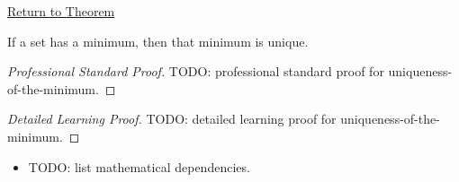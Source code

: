 \newpage
{}
\label{prf:uniqueness-of-the-minimum}

\begin{remark*}[Return]
\hyperref[prop:uniqueness-of-the-minimum]{Return to Theorem}
\end{remark*}

\begin{proposition*}
If a set has a minimum, then that minimum is unique.
\end{proposition*}

\begin{proof}[Professional Standard Proof]
\LRAProofBodyStart
TODO: professional standard proof for uniqueness-of-the-minimum.
\end{proof}

\begin{proof}[Detailed Learning Proof]
\LRAProofBodyStart
TODO: detailed learning proof for uniqueness-of-the-minimum.
\end{proof}

\begin{remark*}
\end{remark*}

\begin{dependencies}
\begin{itemize}
  \item TODO: list mathematical dependencies.
\end{itemize}
\end{dependencies}

\clearpage
